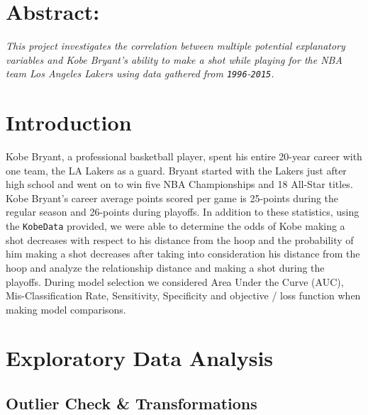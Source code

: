 \documentclass[american,]{article}
\title{}
\author{}
\date{}
\begin{document}
{
\setcounter{tocdepth}{2}
\tableofcontents
}
\newpage

\hypertarget{abstract}{%
\section{\texorpdfstring{\textbf{Abstract:}}{Abstract:}}\label{abstract}}

\emph{This project investigates the correlation between multiple potential explanatory variables and Kobe Bryant's ability to make a shot while playing for the NBA team Los Angeles Lakers using data gathered from \texttt{1996}-\texttt{2015}.}

\hypertarget{introduction}{%
\section{\texorpdfstring{\textbf{Introduction}}{Introduction}}\label{introduction}}

Kobe Bryant, a professional basketball player, spent his entire 20-year career with one team, the LA Lakers as a guard. Bryant started with the Lakers just after high school and went on to win five NBA Championships and 18 All-Star titles. Kobe Bryant's career average points scored per game is 25-points during the regular season and 26-points during playoffs. In addition to these statistics, using the \texttt{KobeData} provided, we were able to determine the odds of Kobe making a shot decreases with respect to his distance from the hoop and the probability of him making a shot decreases after taking into consideration his distance from the hoop and analyze the relationship distance and making a shot during the playoffs. During model selection we considered Area Under the Curve (AUC), Mis-Classification Rate, Sensitivity, Specificity and objective / loss function when making model comparisons.

\hypertarget{exploratory-data-analysis}{%
\section{\texorpdfstring{\textbf{Exploratory Data Analysis}}{Exploratory Data Analysis}}\label{exploratory-data-analysis}}

\hypertarget{outlier-check-transformations}{%
\subsection{\texorpdfstring{\textbf{Outlier Check \& Transformations}}{Outlier Check \& Transformations}}\label{outlier-check-transformations}}
\end{document}
